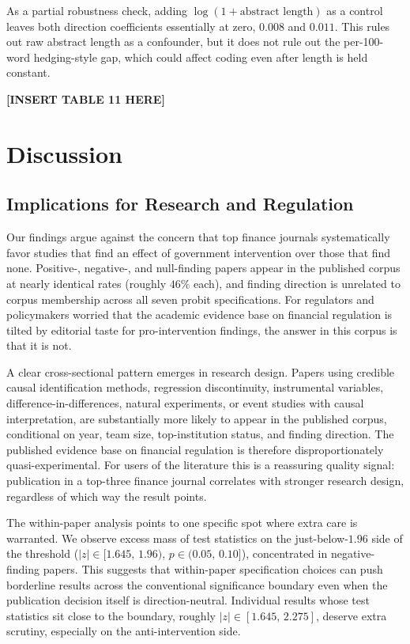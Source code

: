 \documentclass[12pt]{article}
\begin{document}
As a partial robustness check, adding $\log(1+\text{abstract length})$
as a control leaves both direction coefficients essentially at zero,
$0.008$ and $0.011$.  This rules out raw abstract length as a
confounder, but it does not rule out the per-100-word hedging-style
gap, which could affect coding even after length is held constant.


\begin{center}
\textbf{[INSERT TABLE 11 HERE]}
\end{center}

\section{Discussion}
\label{sec:discussion}

\subsection{Implications for Research and Regulation}

Our findings argue against the concern that top finance journals
systematically favor studies that find an effect of government
intervention over those that find none.  Positive-, negative-, and
null-finding papers appear in the published corpus at nearly
identical rates (roughly $46\%$ each), and finding direction is
unrelated to corpus membership across all seven probit
specifications.  For regulators and policymakers worried that the
academic evidence base on financial regulation is tilted by
editorial taste for pro-intervention findings, the answer in this
corpus is that it is not.

A clear cross-sectional pattern emerges in research design.  Papers
using credible causal identification methods, regression
discontinuity, instrumental variables, difference-in-differences,
natural experiments, or event studies with causal
interpretation, are substantially more likely to appear in the
published corpus, conditional on year, team size, top-institution
status, and finding direction.  The published evidence base on
financial regulation is therefore disproportionately
quasi-experimental.  For users of the literature this is a
reassuring quality signal: publication in a top-three finance
journal correlates with stronger research design, regardless of
which way the result points.

The within-paper analysis points to one specific spot where extra
care is warranted.  We observe excess mass of test statistics on the
just-below-$1.96$ side of the threshold ($|z|\in[1.645,\,1.96)$,
$p \in (0.05,\,0.10]$), concentrated in negative-finding papers.
This suggests that within-paper specification choices can push
borderline results across the conventional significance boundary
even when the publication decision itself is direction-neutral.
Individual results whose test statistics sit close to the boundary,
roughly $|z|\in[1.645,\,2.275]$, deserve extra scrutiny, especially
on the anti-intervention side.
\end{document}
